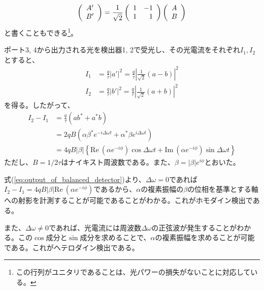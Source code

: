 \begin{equation}
  \left( \begin{array}{c}
  	A' \\ B'
  \end{array}
  \right) =
  \frac{1}{\sqrt 2}\left( \begin{array}{r r} 
  	1 & -1 \\ 1 & 1
 \end{array}
	\right)
	\left( \begin{array}{c}
		A \\ B
	\end{array} \right)
	\label{eq:beamsplitter_matrix}
\end{equation}
と書くこともできる\footnote{この行列がユニタリであることは、光パワーの損失がないことに対応している。}。

ポート3, 4から出力される光を検出器1, 2で受光し、その光電流をそれぞれ$I_1, I_2$とすると、
\begin{equation}
\begin{aligned}
  I_1 &= \frac q \tau |a'|^2 = \frac{q}{\tau}\left|\frac{1}{\sqrt 2} (a - b)\right|^2\\
  I_2 &= \frac q \tau |b'|^2 = \frac{q}{\tau}\left|\frac{1}{\sqrt 2} (a + b)\right|^2
\end{aligned}
\end{equation}
を得る。したがって、
\begin{equation}
\begin{aligned}
  I_2 - I_1 &= \frac{q}{\tau}(ab^* + a^* b)\\
  &= 2qB(\alpha \beta^* e^{-i\Delta\omega t} + \alpha^* \beta e^{i\Delta\omega t})\\
  &= 4qB|\beta|\left\{\mathrm{Re} \  (\alpha e^{-i\phi}) \cos \Delta \omega t + \mathrm{Im} \ (\alpha e^{-i\phi}) \sin \Delta \omega t\right\}
\end{aligned}\label{eq:output_of_balanced_detector}
\end{equation}
ただし、$B = 1/2\tau$はナイキスト周波数である。また、$\beta = |\beta|e^{i\phi}$とおいた。

式(\ref{eq:output_of_balanced_detector})より、$\Delta \omega = 0$であれば$I_2 - I_1 = 4qB|\beta| \mathrm{Re} \ (\alpha e^{-i\phi})$であるから、$\alpha$の複素振幅の$\beta$の位相を基準とする軸への射影を計測することが可能であることがわかる。これがホモダイン検出である。

また、$\Delta \omega \neq 0$であれば、光電流には周波数$\Delta \omega$の正弦波が発生することがわかる。この$\cos$成分と$\sin$成分を求めることで、$\alpha$の複素振幅を求めることが可能である。これがヘテロダイン検出である。

